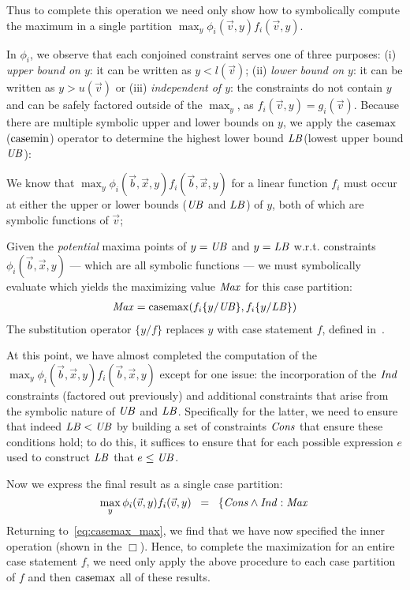  Thus to complete this operation we need only
show how to symbolically compute the maximum in a single partition 
$\max_y \phi_i(\vec{v},y) f_i(\vec{v},y)$.

In $\phi_i$, we observe that each conjoined constraint serves one of
three purposes: (i) \emph{upper bound on $y$}: it can be written
as $y < l(\vec{v})$; (ii) \emph{lower bound on $y$}: it can be written as $y >
u(\vec{v})$ or (iii) \emph{independent of $y$}: the constraints do not contain $y$
and can be safely factored outside of the $\max_y$, as $f_i(\vec{v},y) =  g_i(\vec{v})$.  
Because there are multiple symbolic upper and lower
bounds on $y$, we apply the $\mathrm{casemax}$ ($\mathrm{casemin}$) operator to determine the highest lower bound $\mathit{LB}$(lowest upper bound $\mathit{UB}$):

We know that $\max_y \phi_i(\vec{b},\vec{x},y)
f_i(\vec{b},\vec{x},y)$ for a linear function $f_i$ must occur at either the upper or lower bounds ($\mathit{UB}$ and $\mathit{LB}$) of $y$, both of which are symbolic functions of $\vec{v}$; 

Given the \emph{potential} maxima points of $y = \mathit{UB}$ and $y = \mathit{LB}$ w.r.t. constraints $\phi_i(\vec{b},\vec{x},y)$ --- which are all symbolic functions --- we must symbolically evaluate which yields the maximizing value $\mathit{Max}$ for this case partition: {\footnotesize
\begin{align*}
\mathit{Max} = \mathrm{casemax}( f_i \{ y / \mathit{UB} \}, f_i \{ y / \mathit{LB} \})
\end{align*}} 
The substitution operator $\{ y / f \}$ replaces $y$ with case statement $f$, 
defined in~\cite{sanner_uai11}.

At this point, we have almost completed the computation
of the $\max_y \phi_i(\vec{b},\vec{x},y) f_i(\vec{b},\vec{x},y)$
except for one issue: the incorporation of the $\mathit{Ind}$ constraints
(factored out previously) and additional constraints that arise from the
symbolic nature of $\mathit{UB}$ and $\mathit{LB}$.  Specifically
for the latter, we need to ensure that indeed $\mathit{LB} < \mathit{UB}$
by building a set of constraints $\mathit{Cons}$ that ensure these conditions hold; to do this,
it suffices to ensure that for each possible expression $e$ used to
construct $\mathit{LB}$ that $e \leq \mathit{UB}$.

Now we express the final result as a single case partition:
\begin{equation*}
\max_y \phi_i(\vec{v},y) f_i(\vec{v},y) \;\; = \;\;
\left\{ \mathit{Cons} \land \mathit{Ind}: \mathit{Max} \right.
\end{equation*}
Returning to~\eqref{eq:casemax_max}, we find that we have
now specified the inner operation (shown in the $\Box$).  
Hence, to complete the maximization for an entire case statement $f$, we need only apply the
above procedure to each case partition of $f$ and then $\mathrm{casemax}$ all
of these results.  

